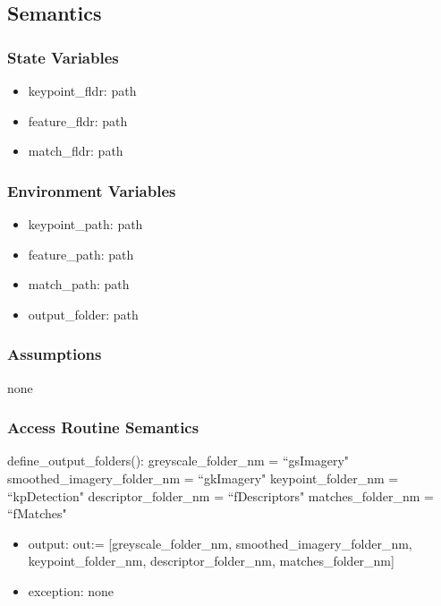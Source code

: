 \documentclass[12pt, titlepage]{article}
\begin{document}
  \subsection{Semantics}
  
  \subsubsection{State Variables}
  \begin{itemize}
    \item keypoint\_fldr: path
    \item feature\_fldr: path
    \item match\_fldr: path
  \end{itemize}
  
  \subsubsection{Environment Variables}
  \begin{itemize}
    \item keypoint\_path: path
    \item feature\_path: path
    \item match\_path: path
    \item output\_folder: path
  \end{itemize}
  
  
  \subsubsection{Assumptions}
  none 
  \subsubsection{Access Routine Semantics}
  
  \noindent define\_output\_folders(): \newline
  greyscale\_folder\_nm = ``gsImagery" \newline
  smoothed\_imagery\_folder\_nm = ``gkImagery" \newline
  keypoint\_folder\_nm = ``kpDetection" \newline
  descriptor\_folder\_nm = ``fDescriptors" \newline
  matches\_folder\_nm = ``fMatches" 
  \begin{itemize}
    \item output: out:= [greyscale\_folder\_nm, smoothed\_imagery\_folder\_nm, keypoint\_folder\_nm, descriptor\_folder\_nm, matches\_folder\_nm]
    \item exception: none 
  \end{itemize}
\end{document}
